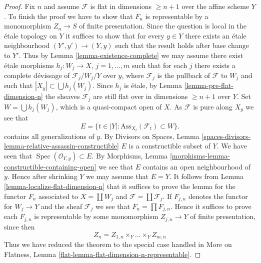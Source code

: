 \documentclass[10pt,a4paper]{amsart}
\theoremstyle{plain}
\theoremstyle{definition}
\theoremstyle{remark}
\numberwithin{equation}{subsection}
\def\Spec{\mathop{\mathrm{Spec}}}
\begin{document}
\begin{proof}
\medskip\noindent
Fix $n$ and assume $\mathcal{F}$ is flat in dimensions $\geq n + 1$
over the affine scheme $Y$.
To finish the proof we have to show that $F_n$ is representable
by a monomorphism $Z_n \to S$ of finite presentation.
Since the question is local in the \'etale topology on $Y$ it suffices to
show that for every $y \in Y$ there exists an \'etale neighbourhood
$(Y', y') \to (Y, y)$ such that the result holds after base change to $Y'$.
Thus by
Lemma \ref{lemma-existence-complete}
we may assume there exist \'etale morphisms $h_j : W_j \to X$,
$j = 1, \ldots, m$ such that for each $j$ there exists a complete
d\'evissage of $\mathcal{F}_j/W_j/Y$ over $y$,
where $\mathcal{F}_j$ is the pullback of $\mathcal{F}$ to $W_j$
and such that $|X_y| \subset \bigcup h_j(W_j)$. Since
$h_j$ is \'etale, by
Lemma \ref{lemma-pre-flat-dimension-n}
the sheaves $\mathcal{F}_j$ are still flat over in
dimensions $\geq n + 1$ over $Y$.
Set $W = \bigcup h_j(W_j)$, which is a quasi-compact open of $X$.
As $\mathcal{F}$ is pure along $X_y$ we see that
$$
E = \{t \in |Y| : \text{Ass}_{X_t}(\mathcal{F}_t) \subset W \}.
$$
contains all generalizations of $y$. By
Divisors on Spaces,
Lemma \ref{spaces-divisors-lemma-relative-assassin-constructible}
$E$ is a constructible subset of $Y$. We have seen that
$\Spec(\mathcal{O}_{Y, y}) \subset E$. By
Morphisms, Lemma \ref{morphisms-lemma-constructible-containing-open}
we see that $E$ contains an open neighbourhood of $y$.
Hence after shrinking $Y$ we may assume that $E = Y$.
It follows from
Lemma \ref{lemma-localize-flat-dimension-n}
that it suffices to prove the lemma for the functor $F_n$ associated to
$X = \coprod W_j$ and $\mathcal{F} = \coprod \mathcal{F}_j$.
If $F_{j, n}$ denotes the functor for $W_j \to Y$ and the sheaf
$\mathcal{F}_j$ we see that $F_n = \prod F_{j, n}$. Hence it suffices
to prove each $F_{j, n}$ is representable by some monomorphism
$Z_{j, n} \to Y$ of finite presentation, since then
$$
Z_n = Z_{1, n} \times_Y \ldots \times_Y Z_{m, n}
$$
Thus we have reduced the theorem to the special case handled in
More on Flatness, Lemma \ref{flat-lemma-flat-dimension-n-representable}.
\end{proof}
\end{document}
